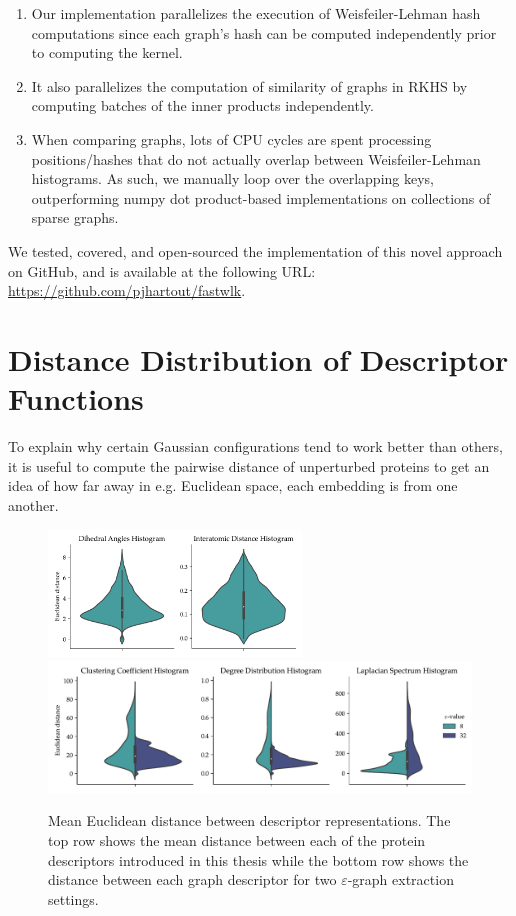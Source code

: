 \begin{enumerate}
\item Our implementation parallelizes the execution of Weisfeiler-Lehman hash
computations since each graph's hash can be computed independently prior to
computing the kernel.
\item It also parallelizes the computation of similarity of graphs in RKHS by
computing batches of the inner products independently.
\item When comparing graphs, lots of CPU cycles are spent processing
positions/hashes that do not actually overlap between Weisfeiler-Lehman
histograms. As such, we manually loop over the overlapping keys, outperforming
numpy dot product-based implementations on collections of sparse graphs.
\end{enumerate}

We tested, covered, and open-sourced the implementation of this novel approach
on GitHub, and is available at the following URL: \url{https://github.com/pjhartout/fastwlk}.

\section{Distance Distribution of Descriptor Functions}
To explain why certain Gaussian configurations tend to work better than others,
it is useful to compute the pairwise distance of unperturbed proteins to get an
idea of how far away in e.g. Euclidean space, each embedding is from one
another.

\begin{figure}
  \centering
  \includegraphics[width=0.6\textwidth]{./figures/results/violin_protein_descriptors.pdf}
  \includegraphics[width=\textwidth]{./figures/results/violin_graph_descriptors.pdf}
  \caption{Mean Euclidean distance between descriptor representations. The top
    row shows the mean distance between each of the protein descriptors
    introduced in this thesis while the bottom row shows the distance between
    each graph descriptor for two $\varepsilon$-graph extraction settings.}
\end{figure}
